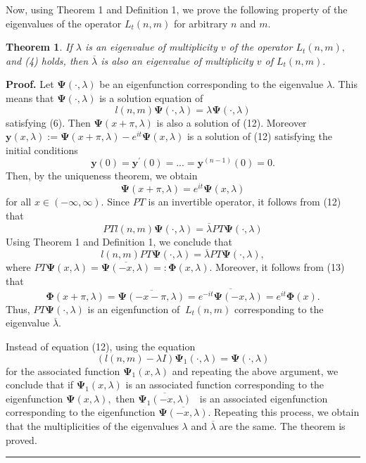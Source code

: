 \documentclass{article}%
\newtheorem{theorem}{Theorem}
{}
\newenvironment{proof}[1][Proof]{\textbf{#1.} }{\ \rule{0.5em}{0.5em}}
\begin{document}
Now, using Theorem 1 and Definition 1, we prove the following property of the
eigenvalues of the operator $L_{t}(n,m)$ for arbitrary $n$ and $m$.

\begin{theorem}
If $\lambda$ is an eigenvalue of multiplicity $v$ of the operator
$L_{t}(n,m),$ and (4) holds, then $\overline{\lambda}$ is also an eigenvalue
of multiplicity $v$ of $L_{t}(n,m).$
\end{theorem}

\begin{proof}
Let $\mathbf{\Psi}(\cdot,\lambda)$ be an eigenfunction corresponding to the
eigenvalue $\lambda.$ This means that $\mathbf{\Psi}(\cdot,\lambda)$ is a
solution equation of
\begin{equation}
l(n,m)\mathbf{\Psi}(\cdot,\lambda)=\lambda\mathbf{\Psi}(\cdot,\lambda)
\tag{12}%
\end{equation}
satisfying (6). Then $\mathbf{\Psi}(x+\pi,\lambda)$ is also a solution of
(12). Moreover $\mathbf{y}(x,\lambda):=\mathbf{\Psi}(x+\pi,\lambda
)-e^{it}\mathbf{\Psi}(x,\lambda)$ is a solution of (12) satisfying the initial
conditions
\[
\mathbf{y}(0)=\mathbf{y}^{\prime}(0)=...=\mathbf{y}^{(n-1)}(0)=0.
\]
Then, by the uniqueness theorem, we obtain
\begin{equation}
\mathbf{\Psi}(x+\pi,\lambda)=e^{it}\mathbf{\Psi}(x,\lambda) \tag{13}%
\end{equation}
for all $x\in(-\infty,\infty).$ Since $PT$ is an invertible operator, it
follows from (12) that
\[
PTl(n,m)\mathbf{\Psi}(\cdot,\lambda)=\overline{\lambda}PT\mathbf{\Psi}%
(\cdot,\lambda)
\]
Using Theorem 1 and Definition 1, we conclude that
\begin{equation}
l(n,m)PT\mathbf{\Psi}(\cdot,\lambda)=\overline{\lambda}PT\mathbf{\Psi}%
(\cdot,\lambda), \tag{14}%
\end{equation}
where $PT\mathbf{\Psi}(x,\lambda)=\overline{\mathbf{\Psi}(-x,\lambda
)}=:\mathbf{\Phi}(x,\lambda).$ Moreover, it follows from (13) that
\[
\mathbf{\Phi}(x+\pi,\lambda)=\overline{\mathbf{\Psi}(-x-\pi,\lambda
)}=\overline{e^{-it}\mathbf{\Psi}(-x,\lambda)}=e^{it}\mathbf{\Phi}(x).
\]
Thus, $PT\mathbf{\Psi}(\cdot,\lambda)$ is an eigenfunction of $\ L_{t}(n,m)$
corresponding to the eigenvalue $\overline{\lambda}.$

Instead of equation (12), using the equation
\[
\left(  l(n,m)-\lambda I\right)  \mathbf{\Psi}_{1}(\cdot,\lambda
)=\mathbf{\Psi}(\cdot,\lambda)
\]
for the associated function $\mathbf{\Psi}_{1}(x,\lambda)$ and repeating the
above argument, we conclude that if $\mathbf{\Psi}_{1}(x,\lambda)$ is an
associated function corresponding to the eigenfunction $\mathbf{\Psi
}(x,\lambda),$ then $\overline{\mathbf{\Psi}_{1}(-x,\lambda)}$ \ is an
associated eigenfunction corresponding to the eigenfunction $\overline
{\mathbf{\Psi}(-x,\lambda)}.$ Repeating this process, we obtain that the
multiplicities of the eigenvalues $\lambda$ and $\overline{\lambda}$ are the
same. The theorem is proved.
\end{proof}
\end{document}
